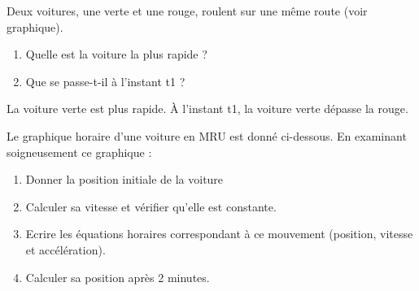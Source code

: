 \begin{exercise}
    Deux voitures, une verte et une rouge, roulent sur une même route (voir graphique).
    \begin{enumerate}[label=\alph*)]
        \item Quelle est la voiture la plus rapide ?
        \item Que se passe-t-il à l'instant t1 ?
    \end{enumerate}

\end{exercise}
\begin{solution}
    La voiture verte est plus rapide. À l'instant t1, la voiture verte dépasse la rouge.
\end{solution}

\newpage

\begin{exercise}
    Le graphique horaire d'une voiture en MRU est donné ci-dessous. En examinant soigneusement ce graphique :
    \begin{enumerate}[label=\alph*)]
        \item Donner la position initiale de la voiture
        \item Calculer sa vitesse et vérifier qu'elle est constante.
        \item Ecrire les équations horaires correspondant à ce mouvement (position, vitesse et accélération).
        \item Calculer sa position après 2 minutes.
    \end{enumerate}
\end{exercise}
\begin{solution}
\end{solution}

